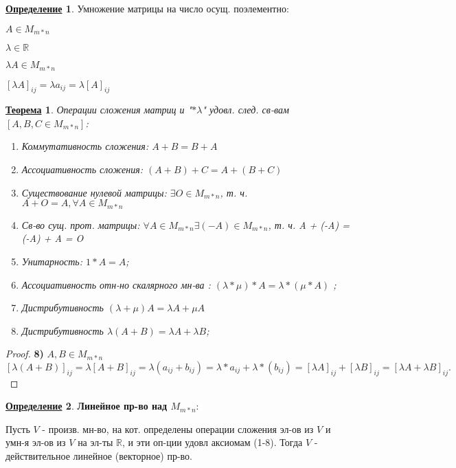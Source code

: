 \documentclass[12pt]{article}
\newcommand{\R}{\mathbb{R}}
\newtheorem{theorem}{\underline{Теорема}}[section]
\theoremstyle{definition}
\newtheorem{definition}{\underline{Определение}}[section]
\theoremstyle{definition}
\begin{document}
\begin{definition}
    Умножение матрицы на число осущ. поэлементно:

$A \in M_{m * n}$ 

$\lambda \in \R$ 

$\lambda A \in M_{m * n}$

$[\lambda A]_{ij} = \lambda a_{ij} = \lambda [A]_{ij}$
\end{definition}

\begin{theorem}
Операции сложения матриц и  "$* \lambda$" удовл. след. св-вам $[A, B, C \in M_{m * n}]$:

\begin{enumerate}
    \item Коммутативность сложения: $ A + B = B + A$
    \item Ассоциативность сложения: $ (A + B) + C = A + (B + C)$
    \item Существование нулевой матрицы: $ \exists O \in M_{m * n}$, т. ч. $A + O = A, \forall A \in M_{m * n}$
    \item Св-во сущ. прот. матрицы: $\forall A \in M_{m * n} \exists (-A) \in M_{m * n}$, т. ч. A + (-A) = (-A) + A = O
    \item Унитарность: $1 * A = A$;
    \item Ассоциативность отн-но скалярного мн-ва : $(\lambda * \mu) * A = \lambda * (\mu * A)$ ;
    \item Дистрибутивность $(\lambda + \mu) A = \lambda A + \mu A$ 
    \item Дистрибутивность $\lambda (A + B) = \lambda A + \lambda B$;
\end{enumerate}
\end{theorem}

\begin{proof}
\textbf{8) } $A, B \in M_{m * n}$ 
\[
[\lambda(A + B)]_{ij} = \lambda[A + B]_{ij} = \lambda (a_{ij} + b_{ij}) = \lambda * a_{ij} + \lambda * (b_{ij}) = [\lambda A]_{ij} + [\lambda B]_{ij} = [\lambda A + \lambda B]_{ij} 
.\] 
\end{proof}

\begin{definition}
\textbf{Линейное пр-во над $M_{m*n}$}:

Пусть $V$ - произв. мн-во, на кот. определены операции сложения эл-ов из $V$ и умн-я эл-ов из $V$ на эл-ты $\R$, и эти оп-ции удовл аксиомам (1-8). Тогда $V$ - действительное линейное (векторное) пр-во.
\end{definition}
\end{document}
